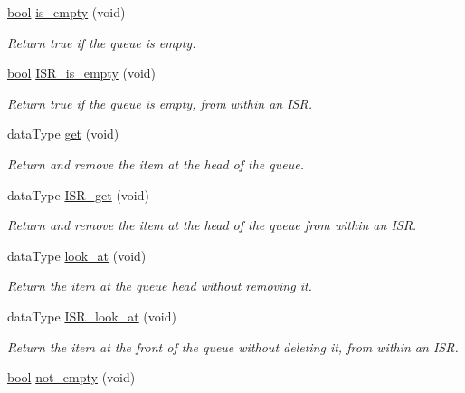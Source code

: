 \begin{DoxyCompactItemize}
\mbox{\hyperlink{group___motor___boolean___type_ga0ecf26b576b9a54eca656b9be7ba6a06}{bool}} \mbox{\hyperlink{class_task_queue_a29c1d8b98bcb89d77919ad9ce69320a1}{is\+\_\+empty}} (void)
\begin{DoxyCompactList}\small\item\em Return true if the queue is empty. \end{DoxyCompactList}\item 
\mbox{\hyperlink{group___motor___boolean___type_ga0ecf26b576b9a54eca656b9be7ba6a06}{bool}} \mbox{\hyperlink{class_task_queue_a15630b93ea2a6428aff8234213fac24f}{I\+S\+R\+\_\+is\+\_\+empty}} (void)
\begin{DoxyCompactList}\small\item\em Return true if the queue is empty, from within an I\+SR. \end{DoxyCompactList}\item 
data\+Type \mbox{\hyperlink{class_task_queue_a8b696b7e87f4e1bb5cfde83f91dcef75}{get}} (void)
\begin{DoxyCompactList}\small\item\em Return and remove the item at the head of the queue. \end{DoxyCompactList}\item 
data\+Type \mbox{\hyperlink{class_task_queue_a57f0fd2a291dacf66983942b82e2997b}{I\+S\+R\+\_\+get}} (void)
\begin{DoxyCompactList}\small\item\em Return and remove the item at the head of the queue from within an I\+SR. \end{DoxyCompactList}\item 
data\+Type \mbox{\hyperlink{class_task_queue_a696a695c31e089cf2361f8a16c2fefe6}{look\+\_\+at}} (void)
\begin{DoxyCompactList}\small\item\em Return the item at the queue head without removing it. \end{DoxyCompactList}\item 
data\+Type \mbox{\hyperlink{class_task_queue_a5f13cf022edebc95b8c9ca36814a820b}{I\+S\+R\+\_\+look\+\_\+at}} (void)
\begin{DoxyCompactList}\small\item\em Return the item at the front of the queue without deleting it, from within an I\+SR. \end{DoxyCompactList}\item 
\mbox{\hyperlink{group___motor___boolean___type_ga0ecf26b576b9a54eca656b9be7ba6a06}{bool}} \mbox{\hyperlink{class_task_queue_a0c24c84baac830cce4d6f528a0eee23c}{not\+\_\+empty}} (void)

\end{DoxyCompactItemize}
